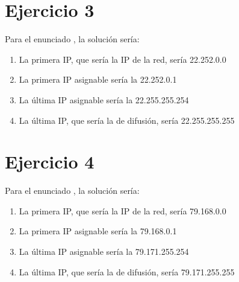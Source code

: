 \documentclass[letterpaper,10pt,spanish]{sphinxmanual}
\begin{document}
\section{Ejercicio 3}
\label{\detokenize{t2_integracion_elementos/ejercicios_subredes_ipv4/rangos_direcciones:id3}}
\sphinxAtStartPar
Para el enunciado , la solución sería:
\begin{enumerate}
%
\item {} 
\sphinxAtStartPar
La primera IP, que sería la IP de la red, sería 22.252.0.0

\item {} 
\sphinxAtStartPar
La primera IP asignable sería la 22.252.0.1

\item {} 
\sphinxAtStartPar
La última IP asignable sería la 22.255.255.254

\item {} 
\sphinxAtStartPar
La última IP, que sería la de difusión, sería 22.255.255.255

\end{enumerate}


\section{Ejercicio 4}
\label{\detokenize{t2_integracion_elementos/ejercicios_subredes_ipv4/rangos_direcciones:id4}}
\sphinxAtStartPar
Para el enunciado , la solución sería:
\begin{enumerate}
%
\item {} 
\sphinxAtStartPar
La primera IP, que sería la IP de la red, sería 79.168.0.0

\item {} 
\sphinxAtStartPar
La primera IP asignable sería la 79.168.0.1

\item {} 
\sphinxAtStartPar
La última IP asignable sería la 79.171.255.254

\item {} 
\sphinxAtStartPar
La última IP, que sería la de difusión, sería 79.171.255.255

\end{enumerate}
\end{document}
